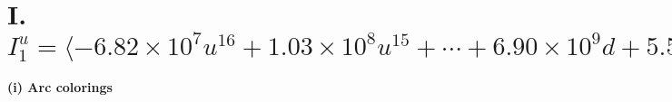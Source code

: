 \documentclass[1p]{elsarticle_modified}
\theoremstyle{definition}
\begin{document}
\newpage
\renewcommand{\arraystretch}{1}
\centering \section*{I. $I^u_{1}= \langle -6.82\times10^{7} u^{16}+1.03\times10^{8} u^{15}+\cdots+6.90\times10^{9} d+5.58\times10^{8},\;-1.18\times10^{8} u^{16}+3.74\times10^{7} u^{15}+\cdots+1.38\times10^{10} c-2.78\times10^{9},\;-7.04\times10^{7} u^{16}+3.88\times10^{7} u^{15}+\cdots+6.90\times10^{9} b+3.90\times10^{9},\;-3.27\times10^{8} u^{16}+2.76\times10^{8} u^{15}+\cdots+6.90\times10^{9} a-7.90\times10^{9},\;u^{17}-2 u^{16}+\cdots-4 u^2+8 \rangle$}
\flushleft \textbf{(i) Arc colorings}\\
\end{document}
